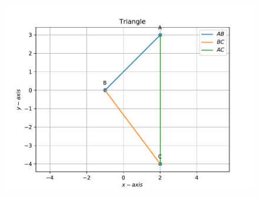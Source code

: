 \documentclass[12pt]{article}
\begin{document}
\begin{enumerate}
\begin{enumerate}
\begin{figure}[!h]
	\begin{center}
		\includegraphics[width=\columnwidth]{./figs/problem1a.pdf}
	\end{center}
\caption{}
\label{fig:Fig1}
\end{figure}


\end{enumerate}
\end{enumerate}
\end{document}
